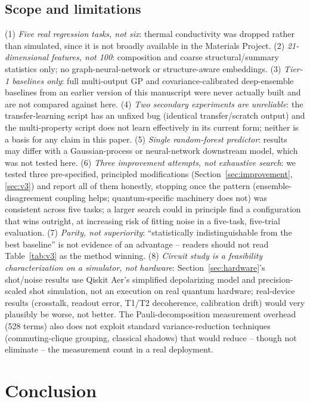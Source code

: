 \documentclass[conference]{IEEEtran}
\begin{document}
\subsection{Scope and limitations}

(1) \emph{Five real regression tasks, not six}: thermal conductivity was dropped rather than simulated, since it is not broadly available in the Materials Project. (2) \emph{21-dimensional features, not 100}: composition and coarse structural/summary statistics only; no graph-neural-network or structure-aware embeddings. (3) \emph{Tier-1 baselines only}: full multi-output GP and covariance-calibrated deep-ensemble baselines from an earlier version of this manuscript were never actually built and are not compared against here. (4) \emph{Two secondary experiments are unreliable}: the transfer-learning script has an unfixed bug (identical transfer/scratch output) and the multi-property script does not learn effectively in its current form; neither is a basis for any claim in this paper. (5) \emph{Single random-forest predictor}: results may differ with a Gaussian-process or neural-network downstream model, which was not tested here. (6) \emph{Three improvement attempts, not exhaustive search}: we tested three pre-specified, principled modifications (Section~\ref{sec:improvement}, \ref{sec:v3}) and report all of them honestly, stopping once the pattern (ensemble-disagreement coupling helps; quantum-specific machinery does not) was consistent across five tasks; a larger search could in principle find a configuration that wins outright, at increasing risk of fitting noise in a five-task, five-trial evaluation. (7) \emph{Parity, not superiority}: ``statistically indistinguishable from the best baseline'' is not evidence of an advantage -- readers should not read Table~\ref{tab:v3} as the method winning. (8) \emph{Circuit study is a feasibility characterization on a simulator, not hardware}: Section~\ref{sec:hardware}'s shot/noise results use Qiskit Aer's simplified depolarizing model and precision-scaled shot simulation, not an execution on real quantum hardware; real-device results (crosstalk, readout error, T1/T2 decoherence, calibration drift) would very plausibly be worse, not better. The Pauli-decomposition measurement overhead (528 terms) also does not exploit standard variance-reduction techniques (commuting-clique grouping, classical shadows) that would reduce -- though not eliminate -- the measurement count in a real deployment.

\section{Conclusion}
\end{document}

